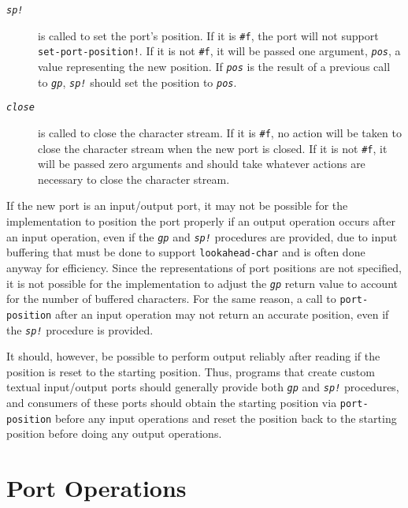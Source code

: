 \begin{description}
\item[\texttt{\textit{sp!}}]  is called to set the port's position.
If it is \texttt{\#{}f}, the port will not support \texttt{set-port-position!}.
If it is not \texttt{\#{}f}, it will be passed one argument, \texttt{\textit{pos}}, a value
representing the new position.
If \texttt{\textit{pos}} is the result of a previous call to \texttt{\textit{gp}}, \texttt{\textit{sp!}} should
set the position to \texttt{\textit{pos}}.

\item[\texttt{\textit{close}}]  is called to close the character stream.
If it is \texttt{\#{}f}, no action will be taken to close the character stream
when the new port is closed.
If it is not \texttt{\#{}f}, it will be passed zero arguments and should
take whatever actions are necessary to close the character stream.

\end{description}


If the new port is an input/output port, it may not be possible for the
implementation to position the port properly if an output operation occurs
after an input operation, even if the \texttt{\textit{gp}} and \texttt{\textit{sp!}} procedures
are provided, due to input buffering that must be done to support
\texttt{lookahead-char} and is often done anyway for efficiency.
Since the representations of port positions are not specified, it is
not possible for the implementation to adjust the \texttt{\textit{gp}} return
value to account for the number of buffered characters.
For the same reason, a call to \texttt{port-position} after an input
operation may not return an accurate position, even if the \texttt{\textit{sp!}}
procedure is provided.


It should, however, be possible to perform output reliably after reading
if the position is reset to the starting position.
Thus, programs that create custom textual input/output ports should generally
provide both \texttt{\textit{gp}} and \texttt{\textit{sp!}} procedures, and consumers of these ports
should obtain the starting position via \texttt{port-position} before any
input operations and reset the position back to the starting position
before doing any output operations.



\section{\label{io_g127}\label{io_h6}Port Operations\label{io_SECTPORTOPERATIONS}}



